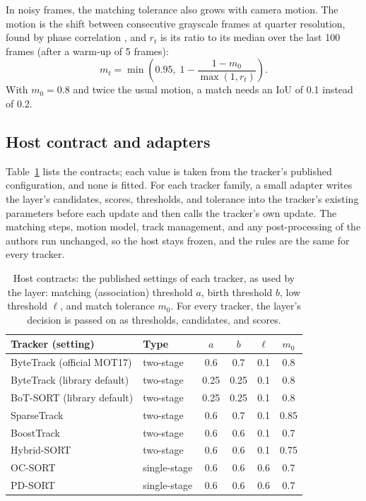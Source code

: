 \documentclass[pdflatex,sn-mathphys-num,iicol]{sn-jnl}
\begin{document}
In noisy frames, the matching tolerance also grows with camera motion. The motion is the shift
between consecutive grayscale frames at quarter resolution, found by phase correlation
\cite{reddy1996phasecorr}, and $r_t$ is its ratio to its median over the last 100 frames (after a
warm-up of 5 frames):
\begin{equation}
m_t=\min\!\left(0.95,\;1-\frac{1-m_0}{\max(1,r_t)}\right).
\label{eq:motion}
\end{equation}
With $m_0=0.8$ and twice the usual motion, a match needs an IoU of 0.1 instead of 0.2.

\subsection{Host contract and adapters}\label{sec:contract}
Table~\ref{tab:contracts} lists the contracts; each value is taken from the tracker's published
configuration, and none is fitted. For each tracker family, a small adapter writes the layer's
candidates, scores, thresholds, and tolerance into the tracker's existing parameters before each
update and then calls the tracker's own update. The matching steps, motion model, track
management, and any post-processing of the authors run unchanged, so the host stays frozen, and the
rules are the same for every tracker.

\begin{table}[t]
\caption{Host contracts: the published settings of each tracker, as used by the layer: matching
(association) threshold $a$, birth threshold $b$, low threshold $\ell$, and match tolerance $m_0$.
For every tracker, the layer's decision is passed on as thresholds, candidates, and scores.}
\label{tab:contracts}
\centering\footnotesize
\setlength{\tabcolsep}{4pt}
\begin{tabular}{@{}>{\raggedright\arraybackslash}p{27mm}lcccc@{}}
\toprule
Tracker (setting) & Type & $a$ & $b$ & $\ell$ & $m_0$\\
\midrule
ByteTrack (official MOT17) & two-stage & 0.6 & 0.7 & 0.1 & 0.8\\
ByteTrack (library default) & two-stage & 0.25 & 0.25 & 0.1 & 0.8\\
BoT-SORT (library default) & two-stage & 0.25 & 0.25 & 0.1 & 0.8\\
SparseTrack & two-stage & 0.6 & 0.7 & 0.1 & 0.85\\
BoostTrack & two-stage & 0.6 & 0.6 & 0.1 & 0.7\\
Hybrid-SORT & two-stage & 0.6 & 0.6 & 0.1 & 0.75\\
OC-SORT & single-stage & 0.6 & 0.6 & 0.6 & 0.7\\
PD-SORT & single-stage & 0.6 & 0.6 & 0.6 & 0.7\\
\bottomrule
\end{tabular}
\end{table}
\end{document}
